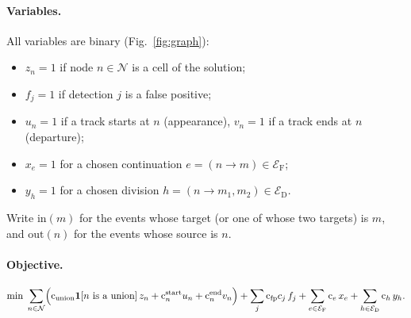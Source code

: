 \documentclass[11pt,a4paper]{article}
\newcommand{\cost}{\mathrm{c}}
\newcommand{\ind}{\mathbf{1}}
\begin{document}
\paragraph{Variables.} All variables are binary (Fig.~\ref{fig:graph}):
\begin{itemize}
\item $z_n=1$ if node $n\in\mathcal N$ is a cell of the solution;
\item $f_j=1$ if detection $j$ is a false positive;
\item $u_n=1$ if a track starts at $n$ (appearance), $v_n=1$ if a track ends at $n$ (departure);
\item $x_e=1$ for a chosen continuation $e=(n\to m)\in\mathcal E_{\mathrm F}$;
\item $y_h=1$ for a chosen division $h=(n\to m_1,m_2)\in\mathcal E_{\mathrm D}$.
\end{itemize}
Write $\mathrm{in}(m)$ for the events whose target (or one of whose two targets) is $m$, and $\mathrm{out}(n)$ for the events whose source is $n$.

\paragraph{Objective.}
\begin{equation}
\min\;\sum_{n\in\mathcal N}\Bigl(\cost_{\mathrm{union}}\ind[n\text{ is a union}]\,z_n+\cost^{\mathrm{start}}_n u_n+\cost^{\mathrm{end}}_n v_n\Bigr)+\sum_{j}\cost_{\mathrm{fp}}c_j\,f_j+\sum_{e\in\mathcal E_{\mathrm F}}\cost_e\,x_e+\sum_{h\in\mathcal E_{\mathrm D}}\cost_h\,y_h.
\end{equation}
\end{document}
